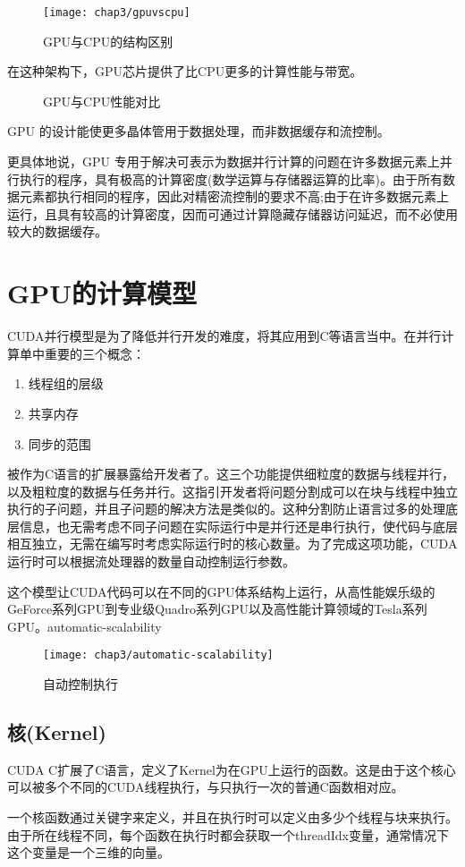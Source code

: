    \begin{figure}[htp]
      \centering
      \texttt{[image: chap3/gpuvscpu]}
      \caption{GPU与CPU的结构区别}
    \end{figure}
    在这种架构下，GPU芯片提供了比CPU更多的计算性能与带宽。
    \begin{figure}[htp]
      \centering
      \hspace{1cm}
      \caption{GPU与CPU性能对比}
    \end{figure}
    GPU 的设计能使更多晶体管用于数据处理，而非数据缓存和流控制。
    \par
    更具体地说，GPU 专用于解决可表示为数据并行计算的问题在许多数据元素上并行执行的程序，具有极高的计算密度(数学运算与存储器运算的比率)。由于所有数据元素都执行相同的程序，因此对精密流控制的要求不高;由于在许多数据元素上运行，且具有较高的计算密度，因而可通过计算隐藏存储器访问延迟，而不必使用较大的数据缓存。
  \section{GPU的计算模型}
    CUDA并行模型是为了降低并行开发的难度，将其应用到C等语言当中。在并行计算单中重要的三个概念：
    \begin{enumerate}
      \item 线程组的层级
      \item 共享内存
      \item 同步的范围
    \end{enumerate}
    被作为C语言的扩展暴露给开发者了。这三个功能提供细粒度的数据与线程并行\cite{cook2013cuda}，以及粗粒度的数据与任务并行。这指引开发者将问题分割成可以在块与线程中独立执行的子问题，并且子问题的解决方法是类似的。这种分割防止语言过多的处理底层信息，也无需考虑不同子问题在实际运行中是并行还是串行执行，使代码与底层相互独立，无需在编写时考虑实际运行时的核心数量。为了完成这项功能，CUDA运行时可以根据流处理器的数量自动控制运行参数。
    \par
    这个模型让CUDA代码可以在不同的GPU体系结构上运行，从高性能娱乐级的GeForce系列GPU到专业级Quadro系列GPU以及高性能计算领域的Tesla系列GPU。automatic-scalability
    \begin{figure}[htp]
      \centering
      \texttt{[image: chap3/automatic-scalability]}
      \caption{自动控制执行}
    \end{figure}
    \subsection{核(Kernel)}
      CUDA C扩展了C语言，定义了Kernel为在GPU上运行的函数。这是由于这个核心可以被多个不同的CUDA线程执行，与只执行一次的普通C函数相对应。
      \par
      一个核函数通过关键字来定义，并且在执行时可以定义由多少个线程与块来执行。由于所在线程不同，每个函数在执行时都会获取一个threadIdx变量，通常情况下这个变量是一个三维的向量。
